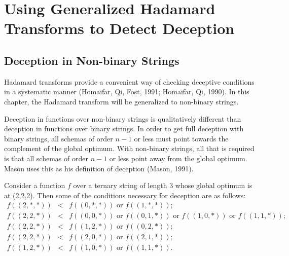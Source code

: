 \typeout{}

\chapter{Using Generalized Hadamard Transforms to Detect Deception}
\section{Deception in Non-binary Strings}
Hadamard transforms provide a convenient way of checking
deceptive conditions in a systematic manner (Homaifar, Qi, Fost, 1991;
Homaifar, Qi, 1990).  In this chapter, the Hadamard transform
will be generalized to non-binary strings.

Deception in functions over non-binary strings is qualitatively different than
deception in functions over binary strings.  In order to get full deception
with binary strings, all schemas of order $n-1$ or less must point towards
the complement of the global optimum.  With non-binary strings, all that
is required is that all schemas of order $n-1$ or less point away from the
global optimum.  Mason uses this as his definition of deception (Mason, 1991).

\begin{example}
Consider a function $f$ over a ternary string of length
3 whose global optimum is at (2,2,2).  Then some of the conditions necessary
for deception are as follows:
\begin{eqnarray}
f((2,*,*)) &<& f((0,*,*)) \mbox{\ or\ } f((1,*,*)); \nonumber\\
f((2,2,*)) &<& f((0,0,*)) \mbox{\ or\ } f((0,1,*)) \mbox{\ or\ } f((1,0,*)) \mbox{\ or\ } f((1,1,*)); \nonumber\\
f((2,2,*)) &<& f((1,2,*)) \mbox{\ or\ } f((0,2,*)); \nonumber \\
f((2,2,*)) &<& f((2,0,*)) \mbox{\ or\ } f((2,1,*)); \nonumber \\
f((1,2,*)) &<& f((1,0,*)) \mbox{\ or\ } f((1,1,*)).
\end{eqnarray}
\end{example}

